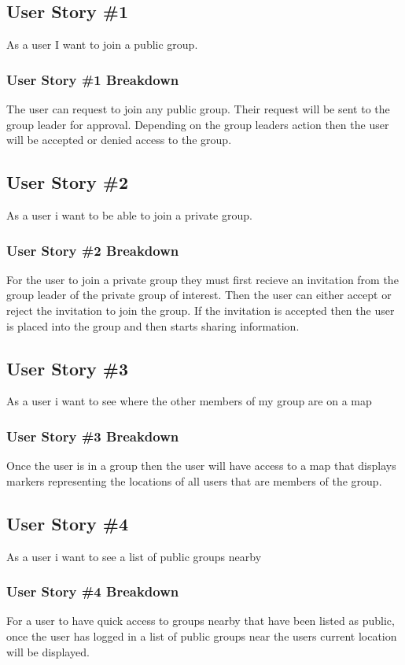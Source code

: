 \subsection{User Story \#1 }
As a user I want to join a public group.

\subsubsection{User Story \#1 Breakdown}
The user can request to join any public group.  Their request will be sent to the group leader for approval.  Depending on the group leaders action then the user will be accepted or denied access to the group. 

\subsection{User Story \#2 }
As a user i want to be able to join a private group.

\subsubsection{User Story \#2 Breakdown}
For the user to join a private group they must first recieve an invitation from the group leader of the private group of interest.  Then the user can either accept or reject the invitation to join the group.  If the invitation is accepted then the user is placed into the group and then starts sharing information. 

\subsection{User Story \#3} 
As a user i want to see where the other members of my group are on a map

\subsubsection{User Story \#3 Breakdown}
Once the user is in a group then the user will have access to a map that displays markers representing the locations of all users that are members of the group.

\subsection{User Story \#4} 
As a user i want to see a list of public groups nearby

\subsubsection{User Story \#4 Breakdown}
For a user to have quick access to groups nearby that have been listed as public, once the user has logged in a list of public groups near the users current location will be displayed.

